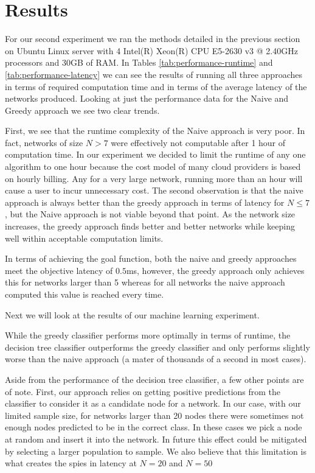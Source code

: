 \section{Results} \label{sec:results}
For our second experiment we ran the methods detailed in the previous section on Ubuntu Linux server with 4 Intel(R) Xeon(R) CPU E5-2630 v3 @ 2.40GHz processors and 30GB of RAM.  In Tables \ref{tab:performance-runtime} and \ref{tab:performance-latency} we can see the results of running all three approaches in terms of required computation time and in terms of the average latency of the networks produced. Looking at just the performance data for the Naive and Greedy approach we see two clear trends.


First, we see that the runtime complexity of the Naive approach is very poor. In fact, networks of size $N>7$ were effectively not computable after 1 hour of computation time. In our experiment we decided to limit the runtime of any one algorithm to one hour because the cost model of many cloud providers is based on hourly billing. Any for a very large network, running more than an hour will cause a user to incur unnecessary cost. The second observation is that the naive approach is always better than the greedy approach in terms of latency for $N \leq 7$, but the Naive approach is not viable beyond that point. As the network size increases, the greedy approach finds better and better networks while keeping well within acceptable computation limits.   




In terms of achieving the goal function, both the naive and greedy approaches meet the objective latency of $0.5$ms, however, the greedy approach only achieves this for networks larger than 5 whereas for all networks the naive approach computed this value is reached every time. 

Next we will look at the results of our machine learning experiment. 

While the greedy classifier performs more optimally in terms of runtime, the decision tree classifier outperforms the greedy classifier and only performs slightly worse than the naive approach (a mater of thousands of a second in most cases).

Aside from the performance of the decision tree classifier, a few other points are of note. First, our approach relies on getting positive predictions from the classifier to consider it as a candidate node for a network. In our case, with our limited sample size, for networks larger than 20 nodes there were sometimes not enough nodes predicted to be in the correct class. In these cases we pick a node at random and insert it into the network. In future this effect could be mitigated by selecting a larger population to sample. We also believe that this limitation is what creates the spies in latency at $N=20$ and $N=50$


